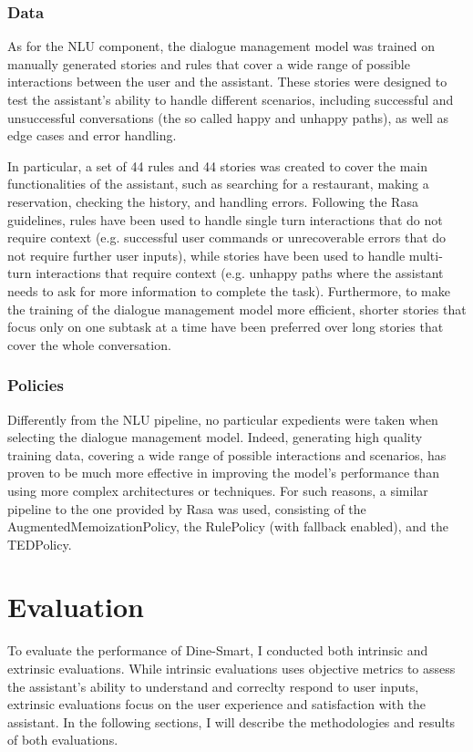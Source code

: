 \documentclass[twocolumn]{article}
\begin{document}
\subsubsection*{Data}

As for the NLU component, the dialogue management model was trained on manually generated stories and rules that cover a wide range of possible interactions between the user and the assistant. These stories were designed to test the assistant's ability to handle different scenarios, including successful and unsuccessful conversations (the so called happy and unhappy paths), as well as edge cases and error handling.

In particular, a set of 44 rules and 44 stories was created to cover the main functionalities of the assistant, such as searching for a restaurant, making a reservation, checking the history, and handling errors. Following the Rasa guidelines, rules have been used to handle single turn interactions that do not require context (e.g. successful user commands or unrecoverable errors that do not require further user inputs), while stories have been used to handle multi-turn interactions that require context (e.g. unhappy paths where the assistant needs to ask for more information to complete the task). Furthermore, to make the training of the dialogue management model more efficient, shorter stories that focus only on one subtask at a time have been preferred over long stories that cover the whole conversation.

\subsubsection*{Policies}

Differently from the NLU pipeline, no particular expedients were taken when selecting the dialogue management model. Indeed, generating high quality training data, covering a wide range of possible interactions and scenarios, has proven to be much more effective in improving the model's performance than using more complex architectures or techniques. For such reasons, a similar pipeline to the one provided by Rasa was used, consisting of the AugmentedMemoizationPolicy, the RulePolicy (with fallback enabled), and the TEDPolicy.

\section{Evaluation}

To evaluate the performance of Dine-Smart, I conducted both intrinsic and extrinsic evaluations. While intrinsic evaluations uses objective metrics to assess the assistant's ability to understand and correclty respond to user inputs, extrinsic evaluations focus on the user experience and satisfaction with the assistant. In the following sections, I will describe the methodologies and results of both evaluations.
\end{document}
